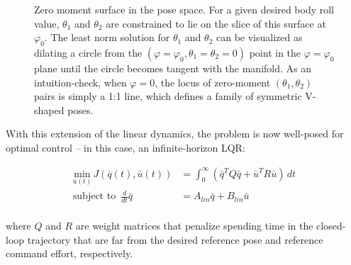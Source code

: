 \documentclass[12pt]{article}
\begin{document}
\begin{figure}[h!]%
    \centering
    \qquad
    \caption{Zero moment surface in the pose space.  For a given desired body roll value, $\theta_{1}$ and $\theta_{2}$ are constrained to lie on the slice of this surface at $\varphi_{0}$.  The least norm solution for $\theta_{1}$ and $\theta_{2}$ can be visualized as dilating a circle from the $(\varphi = \varphi_{0}, \theta_{1} = \theta_{2} = 0)$ point in the $\varphi = \varphi_{0}$ plane until the circle becomes tangent with the manifold.  As an intuition-check, when $\varphi = 0$, the locus of zero-moment $(\theta_1, \theta_2)$ pairs is simply a 1:1 line, which defines a family of symmetric V-shaped poses.}
    \label{fig:example}%
\end{figure}


With this extension of the linear dynamics, the problem is now well-posed for optimal control -- in this case, an infinite-horizon LQR:

\begin{align*}
\underset{\bar{u}(t)}{\text{min}} \, J(\bar{q}(t), \bar{u}(t)) &= \int_0^\infty (\bar{q}^T Q \bar{q} + \bar{u}^T R \bar{u}) \, dt \\
\text{subject to} \,\,\, \frac{d}{dt}\bar{q} &= A_{lin} \bar{q} + B_{lin} \bar{u} \\
\end{align*}

where $Q$ and $R$ are weight matrices that penalize spending time in the closed-loop trajectory that are far from the desired reference pose and reference command effort, respectively.  \\
\end{document}
